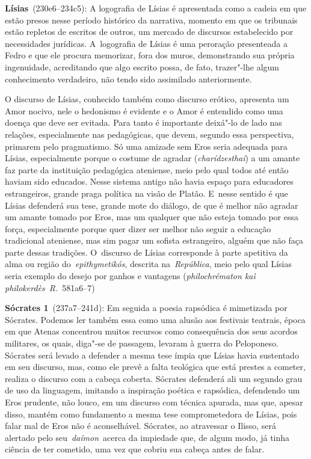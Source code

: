 \textbf{Lísias}~(230e6--234c5): A logografia de Lísias é apresentada
como a cadeia em que estão presos nesse período histórico da narrativa,
momento em que os tribunais estão repletos de escritos de outros, um
mercado de discursos estabelecido por necessidades jurídicas. A~logografia de Lísias é uma peroração presenteada a Fedro e que ele
procura memorizar, fora dos muros, demonstrando sua própria ingenuidade,
acreditando que algo escrito possa, de fato, trazer"-lhe algum
conhecimento verdadeiro, não tendo sido assimilado anteriormente.

O discurso de Lísias, conhecido também como discurso erótico, apresenta
um Amor nocivo, nele o hedonismo é evidente e o Amor é entendido como
uma doença que deve ser evitada. Para tanto é importante deixá"-lo de
lado nas relações, especialmente nas pedagógicas, que devem, segundo
essa perspectiva, primarem pelo pragmatismo. Só uma amizade sem Eros
seria adequada para Lísias, especialmente porque o costume de agradar
(\emph{charídzesthai}) a um amante faz parte da instituição pedagógica
ateniense, meio pelo qual todos até então haviam sido educados. Nesse
sistema antigo não havia espaço para educadores estrangeiros, grande
praga política na visão de Platão. E~nesse sentido é que Lísias
defenderá sua tese, grande mote do diálogo, de que é melhor não agradar
um amante tomado por Eros, mas um qualquer que não esteja tomado por
essa força, especialmente porque quer dizer ser melhor não seguir a
educação tradicional ateniense, mas sim pagar um sofista estrangeiro,
alguém que não faça parte dessas tradições. O~discurso de Lísias
corresponde à parte apetitiva da alma ou região do~\emph{epithymetikós},
descrita na~\emph{República}, meio pelo qual Lísias seria exemplo do
desejo por ganhos e vantagens (\emph{philochrématon kaì
philokerdès}~\emph{R.}~581a6--7)

\textbf{Sócrates 1}~(237a7--241d): Em seguida a poesia rapsódica é
mimetizada por Sócrates. Podemos ler também essa como uma alusão aos
festivais teatrais, época em que Atenas concentrou muitos recursos como
consequência dos seus acordos militares, os quais, diga"-se de passagem,
levaram à guerra do Peloponeso. Sócrates será levado a defender a mesma
tese ímpia que Lísias havia sustentado em seu discurso, mas, como ele
prevê a falta teológica que está prestes a cometer, realiza o discurso
com a cabeça coberta. Sócrates defenderá ali um segundo grau de uso da
linguagem, imitando a inspiração poética e rapsódica, defendendo um Eros
prudente, não louco, em um discurso com técnica apurada, mas que, apesar
disso, mantém como fundamento a mesma tese comprometedora de Lísias,
pois falar mal de Eros não é aconselhável. Sócrates, ao atravessar o
Ilisso, será alertado pelo seu~\emph{daímon}~acerca da impiedade que, de
algum modo, já tinha ciência de ter cometido, uma vez que cobriu sua
cabeça antes de falar.

